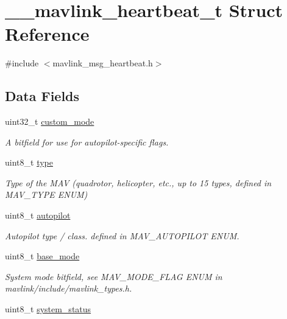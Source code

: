 \hypertarget{struct____mavlink__heartbeat__t}{\section{\+\_\+\+\_\+mavlink\+\_\+heartbeat\+\_\+t Struct Reference}
\label{struct____mavlink__heartbeat__t}
}


{\ttfamily \#include $<$mavlink\+\_\+msg\+\_\+heartbeat.\+h$>$}

\subsection*{Data Fields}
\begin{DoxyCompactItemize}
\item 
uint32\+\_\+t \hyperlink{struct____mavlink__heartbeat__t_a4d8e5d4a59f775887eaecfd58303e17d}{custom\+\_\+mode}
\begin{DoxyCompactList}\small\item\em A bitfield for use for autopilot-\/specific flags. \end{DoxyCompactList}\item 
uint8\+\_\+t \hyperlink{struct____mavlink__heartbeat__t_a2f34a5f641022acd59d9b54e69976341}{type}
\begin{DoxyCompactList}\small\item\em Type of the M\+A\+V (quadrotor, helicopter, etc., up to 15 types, defined in M\+A\+V\+\_\+\+T\+Y\+P\+E E\+N\+U\+M) \end{DoxyCompactList}\item 
uint8\+\_\+t \hyperlink{struct____mavlink__heartbeat__t_a5be04782d8a0bb715ad26c25cce74b9b}{autopilot}
\begin{DoxyCompactList}\small\item\em Autopilot type / class. defined in M\+A\+V\+\_\+\+A\+U\+T\+O\+P\+I\+L\+O\+T E\+N\+U\+M. \end{DoxyCompactList}\item 
uint8\+\_\+t \hyperlink{struct____mavlink__heartbeat__t_a816ec38dcbb0f4948185efbdd96ebb5e}{base\+\_\+mode}
\begin{DoxyCompactList}\small\item\em System mode bitfield, see M\+A\+V\+\_\+\+M\+O\+D\+E\+\_\+\+F\+L\+A\+G E\+N\+U\+M in mavlink/include/mavlink\+\_\+types.\+h. \end{DoxyCompactList}\item 
uint8\+\_\+t \hyperlink{struct____mavlink__heartbeat__t_a914b772577c4898cc5bfe4ece1c8529d}{system\+\_\+status}

\end{DoxyCompactItemize}
